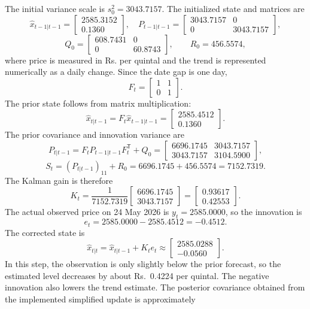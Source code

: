 \documentclass[12pt,a4paper,oneside]{report}
\numberwithin{equation}{chapter}
\numberwithin{figure}{chapter}
\numberwithin{table}{chapter}
\theoremstyle{definition}
\theoremstyle{plain}
\newcommand{\1}{\mathbf{1}}
\newcommand{\trans}{^{\mathsf T}}
\newcommand{\hatt}[1]{\widehat{#1}}
\begin{document}
The initial variance scale is $s_0^2=3043.7157$. The initialized state and matrices are
\[
\hatt{x}_{t-1|t-1}=\begin{bmatrix}2585.3152\\0.1360\end{bmatrix},\quad
P_{t-1|t-1}=\begin{bmatrix}3043.7157&0\\0&3043.7157\end{bmatrix},
\]
\[
Q_0=\begin{bmatrix}608.7431&0\\0&60.8743\end{bmatrix},\qquad R_0=456.5574,
\]
where price is measured in Rs. per quintal and the trend is represented numerically as a daily change. Since the date gap is one day,
\[
F_t=\begin{bmatrix}1&1\\0&1\end{bmatrix}.
\]
The prior state follows from matrix multiplication:
\[
\hatt{x}_{t|t-1}=F_t\hatt{x}_{t-1|t-1}
=\begin{bmatrix}2585.4512\\0.1360\end{bmatrix}.
\]
The prior covariance and innovation variance are
\[
P_{t|t-1}=F_tP_{t-1|t-1}F_t\trans+Q_0
=\begin{bmatrix}6696.1745&3043.7157\\3043.7157&3104.5900\end{bmatrix},
\]
\[
S_t=(P_{t|t-1})_{11}+R_0=6696.1745+456.5574=7152.7319.
\]
The Kalman gain is therefore
\[
K_t=\frac{1}{7152.7319}\begin{bmatrix}6696.1745\\3043.7157\end{bmatrix}
=\begin{bmatrix}0.93617\\0.42553\end{bmatrix}.
\]
The actual observed price on 24 May 2026 is $y_t=2585.0000$, so the innovation is
\[
e_t=2585.0000-2585.4512=-0.4512.
\]
The corrected state is
\[
\hatt{x}_{t|t}=\hatt{x}_{t|t-1}+K_te_t
\approx\begin{bmatrix}2585.0288\\-0.0560\end{bmatrix}.
\]
In this step, the observation is only slightly below the prior forecast, so the estimated level decreases by about Rs.\ 0.4224 per quintal. The negative innovation also lowers the trend estimate. The posterior covariance obtained from the implemented simplified update is approximately
\end{document}
